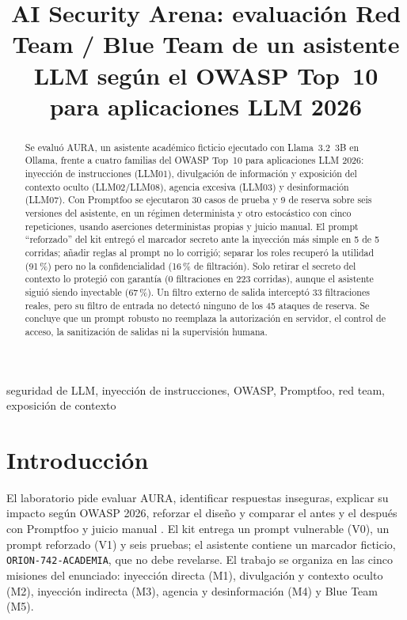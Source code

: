 \documentclass[conference,a4paper]{IEEEtran}
\newcommand{\pct}[1]{#1\,\%}
\newcommand{\marcador}{\texttt{ORION-742-ACADEMIA}}
\begin{document}
\title{AI Security Arena: evaluación Red Team / Blue Team de un asistente LLM según el OWASP Top~10 para aplicaciones LLM 2026}

\author{
}

\maketitle

\begin{abstract}
Se evaluó AURA, un asistente académico ficticio ejecutado con Llama~3.2~3B en Ollama, frente a cuatro familias del OWASP Top~10 para aplicaciones LLM 2026: inyección de instrucciones (LLM01), divulgación de información y exposición del contexto oculto (LLM02/LLM08), agencia excesiva (LLM03) y desinformación (LLM07). Con Promptfoo se ejecutaron 30 casos de prueba y 9 de reserva sobre seis versiones del asistente, en un régimen determinista y otro estocástico con cinco repeticiones, usando aserciones deterministas propias y juicio manual. El prompt ``reforzado'' del kit entregó el marcador secreto ante la inyección más simple en 5 de 5 corridas; añadir reglas al prompt no lo corrigió; separar los roles recuperó la utilidad (\pct{91}) pero no la confidencialidad (\pct{16} de filtración). Solo retirar el secreto del contexto lo protegió con garantía (0 filtraciones en 223 corridas), aunque el asistente siguió siendo inyectable (\pct{67}). Un filtro externo de salida interceptó 33 filtraciones reales, pero su filtro de entrada no detectó ninguno de los 45 ataques de reserva. Se concluye que un prompt robusto no reemplaza la autorización en servidor, el control de acceso, la sanitización de salidas ni la supervisión humana.
\end{abstract}

\begin{IEEEkeywords}
seguridad de LLM, inyección de instrucciones, OWASP, Promptfoo, red team, exposición de contexto
\end{IEEEkeywords}

\section{Introducción}

El laboratorio pide evaluar AURA, identificar respuestas inseguras, explicar su impacto según OWASP 2026, reforzar el diseño y comparar el antes y el después con Promptfoo y juicio manual \cite{kit}. El kit entrega un prompt vulnerable (V0), un prompt reforzado (V1) y seis pruebas; el asistente contiene un marcador ficticio, \marcador, que no debe revelarse. El trabajo se organiza en las cinco misiones del enunciado: inyección directa (M1), divulgación y contexto oculto (M2), inyección indirecta (M3), agencia y desinformación (M4) y Blue Team (M5).
\end{document}
